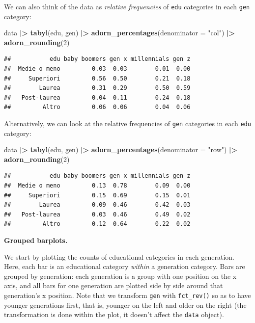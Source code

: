 \documentclass[
]{book}
\newenvironment{Shaded}{\begin{snugshade}}{\end{snugshade}}
\newcommand{\AttributeTok}[1]{\textcolor[rgb]{0.13,0.29,0.53}{#1}}
\newcommand{\DecValTok}[1]{\textcolor[rgb]{0.00,0.00,0.81}{#1}}
\newcommand{\FunctionTok}[1]{\textcolor[rgb]{0.13,0.29,0.53}{\textbf{#1}}}
\newcommand{\NormalTok}[1]{#1}
\newcommand{\SpecialCharTok}[1]{\textcolor[rgb]{0.81,0.36,0.00}{\textbf{#1}}}
\newcommand{\StringTok}[1]{\textcolor[rgb]{0.31,0.60,0.02}{#1}}
\begin{document}
We can also think of the data as \emph{relative frequencies} of \texttt{edu} categories in each \texttt{gen} category:

\begin{Shaded}
\begin{Highlighting}[]
\NormalTok{data }\SpecialCharTok{|\textgreater{}} 
  \FunctionTok{tabyl}\NormalTok{(edu, gen) }\SpecialCharTok{|\textgreater{}} 
  \FunctionTok{adorn\_percentages}\NormalTok{(}\AttributeTok{denominator =} \StringTok{"col"}\NormalTok{) }\SpecialCharTok{|\textgreater{}} 
  \FunctionTok{adorn\_rounding}\NormalTok{(}\DecValTok{2}\NormalTok{)}
\end{Highlighting}
\end{Shaded}

\begin{verbatim}
##           edu baby boomers gen x millennials gen z
##  Medie o meno         0.03  0.03        0.01  0.00
##     Superiori         0.56  0.50        0.21  0.18
##        Laurea         0.31  0.29        0.50  0.59
##   Post-laurea         0.04  0.11        0.24  0.18
##         Altro         0.06  0.06        0.04  0.06
\end{verbatim}

Alternatively, we can look at the relative frequencies of \texttt{gen} categories in each \texttt{edu} category:

\begin{Shaded}
\begin{Highlighting}[]
\NormalTok{data }\SpecialCharTok{|\textgreater{}} 
  \FunctionTok{tabyl}\NormalTok{(edu, gen) }\SpecialCharTok{|\textgreater{}} 
  \FunctionTok{adorn\_percentages}\NormalTok{(}\AttributeTok{denominator =} \StringTok{"row"}\NormalTok{) }\SpecialCharTok{|\textgreater{}} 
  \FunctionTok{adorn\_rounding}\NormalTok{(}\DecValTok{2}\NormalTok{)}
\end{Highlighting}
\end{Shaded}

\begin{verbatim}
##           edu baby boomers gen x millennials gen z
##  Medie o meno         0.13  0.78        0.09  0.00
##     Superiori         0.15  0.69        0.15  0.01
##        Laurea         0.09  0.46        0.42  0.03
##   Post-laurea         0.03  0.46        0.49  0.02
##         Altro         0.12  0.64        0.22  0.02
\end{verbatim}

\textbf{Grouped barplots.}

We start by plotting the counts of educational categories in each generation. Here, each bar is an educational category \emph{within} a generation category. Bars are grouped by generation: each generation is a group with one position on the x axis, and all bars for one generation are plotted side by side around that generation's x position. Note that we transform \texttt{gen} with \texttt{fct\_rev()} so as to have younger generations first, that is, younger on the left and older on the right (the transformation is done within the plot, it doesn't affect the \texttt{data} object).
\end{document}
